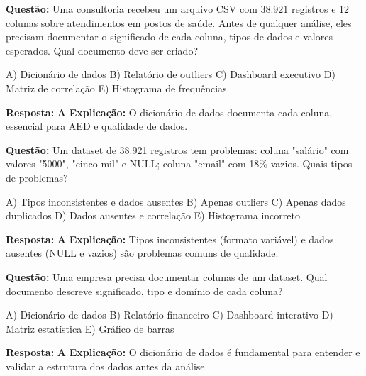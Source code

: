 \begin{SolvedBox}[title=Questão de Fixação 1 - ETL e Qualidade de Dados]
\textbf{Questão:} Uma consultoria recebeu um arquivo CSV com 38.921 registros e 12 colunas sobre atendimentos em postos de saúde. Antes de qualquer análise, eles precisam documentar o significado de cada coluna, tipos de dados e valores esperados. Qual documento deve ser criado?

A) Dicionário de dados  
B) Relatório de outliers  
C) Dashboard executivo  
D) Matriz de correlação  
E) Histograma de frequências

\textbf{Resposta:} \textbf{A}  
\textbf{Explicação:} O dicionário de dados documenta cada coluna, essencial para AED e qualidade de dados.
\end{SolvedBox}

\begin{SolvedBox}[title=Questão de Fixação 2 - Qualidade de Dados]
\textbf{Questão:} Um dataset de 38.921 registros tem problemas: coluna "salário" com valores "5000", "cinco mil" e NULL; coluna "email" com 18\% vazios. Quais tipos de problemas?

A) Tipos inconsistentes e dados ausentes  
B) Apenas outliers  
C) Apenas dados duplicados  
D) Dados ausentes e correlação  
E) Histograma incorreto

\textbf{Resposta:} \textbf{A}  
\textbf{Explicação:} Tipos inconsistentes (formato variável) e dados ausentes (NULL e vazios) são problemas comuns de qualidade.
\end{SolvedBox}

\begin{SolvedBox}[title=Questão de Fixação 3 - Dicionário de Dados]
\textbf{Questão:} Uma empresa precisa documentar colunas de um dataset. Qual documento descreve significado, tipo e domínio de cada coluna?

A) Dicionário de dados  
B) Relatório financeiro  
C) Dashboard interativo  
D) Matriz estatística  
E) Gráfico de barras

\textbf{Resposta:} \textbf{A}  
\textbf{Explicação:} O dicionário de dados é fundamental para entender e validar a estrutura dos dados antes da análise.
\end{SolvedBox}



